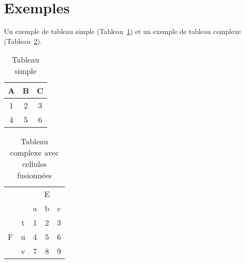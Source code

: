 \documentclass[a4paper,12pt]{report}
\begin{document}
\section{Exemples}

Un exemple de tableau simple (Tableau~\ref{tableau_simple}) et un exemple de tableau complexe (Tableau~\ref{tableau_complexe}).
\begin{table}[hbtp]
\centering
\begin{tabular}{|c|c|c|}
\hline
A & B & C \\ \hline
1 & 2 & 3 \\ \hline
4 & 5 & 6 \\ \hline
\end{tabular}
\caption{Tableau simple}
\label{tableau_simple}
\end{table}


\begin{table}[hbtp]
\centering
\begin{tabular}{|c|c|c|c|c|}
\hline
\multicolumn{2}{|c|}{\multirow{2}{*}{}} & \multicolumn{3}{c|}{E} \\ \cline{3-5} 
\multicolumn{2}{|c|}{}                  & a      & b     & c     \\ \hline
\multirow{3}{*}{F}          & t         & 1      & 2     & 3     \\ \cline{2-5} 
                            & u         & 4      & 5     & 6     \\ \cline{2-5} 
                            & v         & 7      & 8     & 9     \\ \hline
\end{tabular}
\caption{Tableau complexe avec cellules fusionnées}
\label{tableau_complexe}
\end{table}

\end{document}
